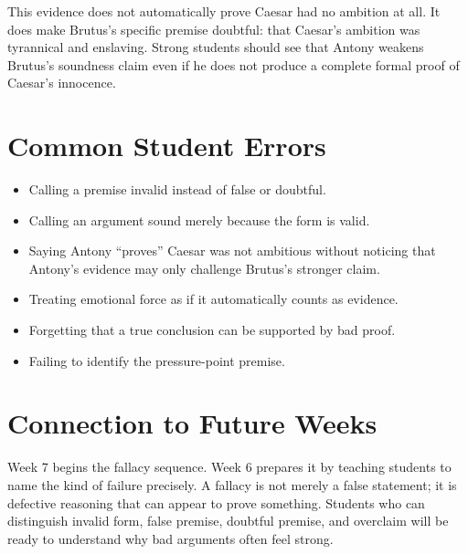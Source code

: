 \documentclass[12pt]{article}
\begin{document}
This evidence does not automatically prove Caesar had no ambition at all. It does make Brutus's specific premise doubtful: that Caesar's ambition was tyrannical and enslaving. Strong students should see that Antony weakens Brutus's soundness claim even if he does not produce a complete formal proof of Caesar's innocence.

\section*{Common Student Errors}
\begin{itemize}[leftmargin=*]
\item Calling a premise invalid instead of false or doubtful.
\item Calling an argument sound merely because the form is valid.
\item Saying Antony ``proves'' Caesar was not ambitious without noticing that Antony's evidence may only challenge Brutus's stronger claim.
\item Treating emotional force as if it automatically counts as evidence.
\item Forgetting that a true conclusion can be supported by bad proof.
\item Failing to identify the pressure-point premise.
\end{itemize}

\section*{Connection to Future Weeks}
Week 7 begins the fallacy sequence. Week 6 prepares it by teaching students to name the kind of failure precisely. A fallacy is not merely a false statement; it is defective reasoning that can appear to prove something. Students who can distinguish invalid form, false premise, doubtful premise, and overclaim will be ready to understand why bad arguments often feel strong.
\end{document}
